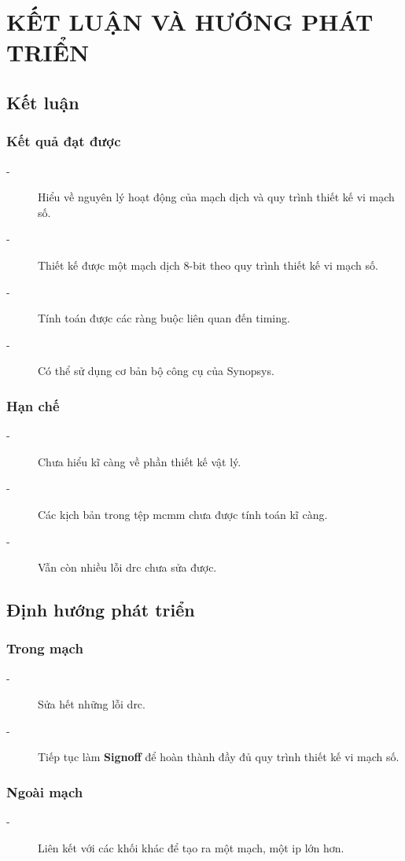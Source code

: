 \chapter{KẾT LUẬN VÀ HƯỚNG PHÁT TRIỂN}
\label{Chapter6}

\section{Kết luận}

\subsection{Kết quả đạt được}

\begin{description}
    \item[-] Hiểu về nguyên lý hoạt động của mạch dịch và quy trình thiết kế vi mạch số.
    \item[-] Thiết kế được một mạch dịch 8-bit theo quy trình thiết kế vi mạch số.
    \item[-] Tính toán được các ràng buộc liên quan đến timing.
    \item[-] Có thể sử dụng cơ bản bộ công cụ của Synopsys.
\end{description}

\subsection{Hạn chế}

\begin{description}
    \item[-] Chưa hiểu kĩ càng về phần thiết kế vật lý.
    \item[-] Các kịch bản trong tệp \acrshort{mcmm} chưa được tính toán kĩ càng.
    \item[-] Vẫn còn nhiều lỗi \acrshort{drc} chưa sửa được. 
\end{description}

\section{Định hướng phát triển}

\subsection{Trong mạch}

\begin{description}
    \item[-] Sửa hết những lỗi \acrshort{drc}.
    \item[-] Tiếp tục làm \textbf{Signoff} để hoàn thành đầy đủ quy trình thiết kế vi mạch số.
\end{description}

\subsection{Ngoài mạch}

\begin{description}
    \item[-] Liên kết với các khối khác để tạo ra một mạch, một \acrshort{ip} lớn hơn.
\end{description}
